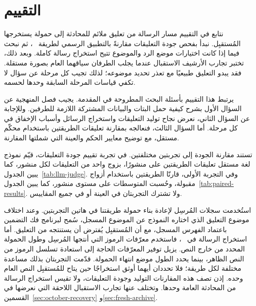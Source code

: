 \section{التقييم}
\label{sec:evaluation}

نتابع في التقييم مسار الرسالة من تعليق ملائم للمحادثة إلى حمولة يستخرجها المُستقبِل. نبدأ بفحص جودة التعليقات مقارنةً بالتطبيق الرسمي لطريقة ~\cite{lin2024zero}، ثم نبحث فيما إذا كانت اختيارات موضع الرد والموضوع تتيح استخراج رسالة كاملة. وبعد ذلك، تختبر تجارب الأرشيف الاستقبال عندما يجلب الطرفان سياقهما العام بصورة مستقلة. فقد يبدو التعليق طبيعيًا مع تعذر تحديد موضوعه؛ لذلك تجيب كل مرحلة عن سؤال لا تكفي قياسات المرحلة السابقة وحدها لحسمه.

يرتبط هذا التقييم بأسئلة البحث المطروحة في المقدمة. يجيب فصل المنهجية عن السؤال الأول بشرح كيفية حمل البتات والبيانات المشتركة اللازمة للطرفين. وللإجابة عن السؤال الثاني، نعرض نجاح توليد التعليقات واستخراج الرسائل وأسباب الإخفاق في كل مرحلة. أما السؤال الثالث، فنعالجه بمقارنة تعليقات الطريقتين باستخدام محكّم مستقل، مع توضيح معايير الحكم والعينة التي شملتها المقارنة.

تستند مقارنة الجودة إلى تجربتين مختلفتين.
في تجربة تقييم جودة التعليقات، قيّم نموذج لغة مستقل تعليقات الطريقتين على  منشورًا، بزوج واحد من التعليقات لكل منشور، كما يبين الجدول~\ref{tab:llm-judge}.
وفي التجربة الأولى، قارنّا الطريقتين باستخدام  أزواج مقبولة، وحُسبت المتوسطات على مستوى  منشور، كما يبين الجدول~\ref{tab:paired-results}.
ولا تشترك التجربتان في العينة أو في جميع المقاييس.

\label{par:baseline-receiver-inputs}
استُخدمت سجلات المُرسِل لإعادة بناء حمولة طريقتنا في هاتين التجربتين. وعند اختلاف موضوع التعليق الذي اختاره النموذج عن الموضوع المسجل، سُمح لبرنامج فك التضمين باعتماد الفهرس المسجل، مع أن المُستقبِل يُفترض أن يستنتجه من التعليق.
أما استخراج الرسالة في ~\cite{lin2024zero}، فاستخدم معرّفات الرموز التي أنتجها المُرسِل وطول الحمولة المحدد من خارج النص. يزيل توفير المعرّفات الحاجة إلى استعادة تسلسل الرموز من النص الظاهر، بينما يحدد الطول موضع انتهاء الحمولة.
قدّمت التجربتان بذلك مساعدة مختلفة لكل طريقة؛ فلا تحددان أيهما أوثق استخراجًا حين يتاح للمُستقبِل النص العام وحده.
إذن تصف هذه المقارنات التوليد وجودة التعليقات، ولا تقيس استخراج الرسالة من المحادثة العامة وحدها.
وتختلف عنها تجارب الاستقبال اللاحقة التي نعرضها في القسمين~\ref{sec:october-recovery} و\ref{sec:fresh-archive}.





